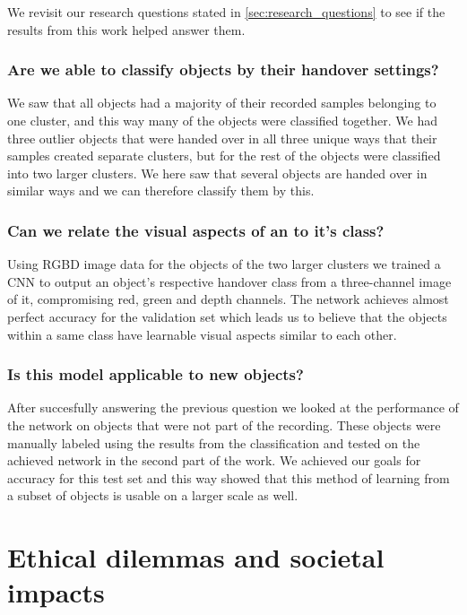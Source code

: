We revisit our research questions stated in \ref{sec:research_questions} to see if the results from this work helped answer them.

\subsubsection*{Are we able to classify objects by their handover settings?}

We saw that all objects had a majority of their recorded samples belonging to one cluster, and this way many of the objects were classified together. We had three outlier objects that were handed over in all three unique ways that their samples created separate clusters, but for the rest of the objects were classified into two larger clusters. We here saw that several objects are handed over in similar ways and we can therefore classify them by this.

\subsubsection*{Can we relate the visual aspects of an to it's class?}

Using RGBD image data for the objects of the two larger clusters we trained a CNN to output an object's respective handover class from a three-channel image of it, compromising red, green and depth channels. The network achieves almost perfect accuracy for the validation set which leads us to believe that the objects within a same class have learnable visual aspects similar to each other.

\subsubsection*{Is this model applicable to new objects?}

After succesfully answering the previous question we looked at the performance of the network on objects that were not part of the recording. These objects were manually labeled using the results from the classification and tested on the achieved network in the second part of the work. We achieved our goals for accuracy for this test set and this way showed that this method of learning from a subset of objects is usable on a larger scale as well.



\section{Ethical dilemmas and societal impacts}

